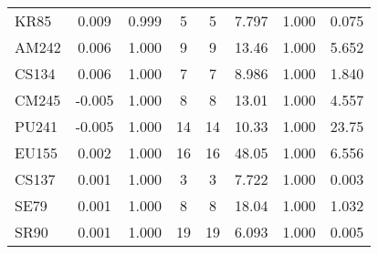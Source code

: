 \begin{tabular}{|l|ccccccc|}
KR85 & 0.009 & 0.999 & 5 & 5 & 7.797 & 1.000 & 0.075\\
AM242 & 0.006 & 1.000 & 9 & 9 & 13.46 & 1.000 & 5.652\\
CS134 & 0.006 & 1.000 & 7 & 7 & 8.986 & 1.000 & 1.840\\
CM245 & -0.005 & 1.000 & 8 & 8 & 13.01 & 1.000 & 4.557\\
PU241 & -0.005 & 1.000 & 14 & 14 & 10.33 & 1.000 & 23.75\\
EU155 & 0.002 & 1.000 & 16 & 16 & 48.05 & 1.000 & 6.556\\
CS137 & 0.001 & 1.000 & 3 & 3 & 7.722 & 1.000 & 0.003\\
SE79 & 0.001 & 1.000 & 8 & 8 & 18.04 & 1.000 & 1.032\\
SR90 & 0.001 & 1.000 & 19 & 19 & 6.093 & 1.000 & 0.005\\
\hline
\end{tabular}